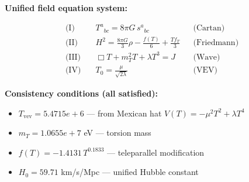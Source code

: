 
\textbf{Unified field equation system:}

\begin{align}
  \text{(I)} \quad & T^a{}_{bc} = 8\pi G \, s^a{}_{bc} && \text{(Cartan)} \\
  \text{(II)} \quad & H^2 = \frac{8\pi G}{3}\rho - \frac{f(T)}{6} + \frac{Tf_T}{3} && \text{(Friedmann)} \\
  \text{(III)} \quad & \Box T + m_T^2 T + \lambda T^3 = J && \text{(Wave)} \\
  \text{(IV)} \quad & T_0 = \frac{\mu}{\sqrt{2\lambda}} && \text{(VEV)}
\end{align}

\textbf{Consistency conditions (all satisfied):}
\begin{itemize}
  \item $T_{\text{vev}} = 5.4715e+6$ — from Mexican hat $V(T) = -\mu^2 T^2 + \lambda T^4$
  \item $m_T = 1.0655e+7$ eV — torsion mass
  \item $f(T) = -1.4131 \, T^{0.1833}$ — teleparallel modification
  \item $H_0 = 59.71$ km/s/Mpc — unified Hubble constant
\end{itemize}